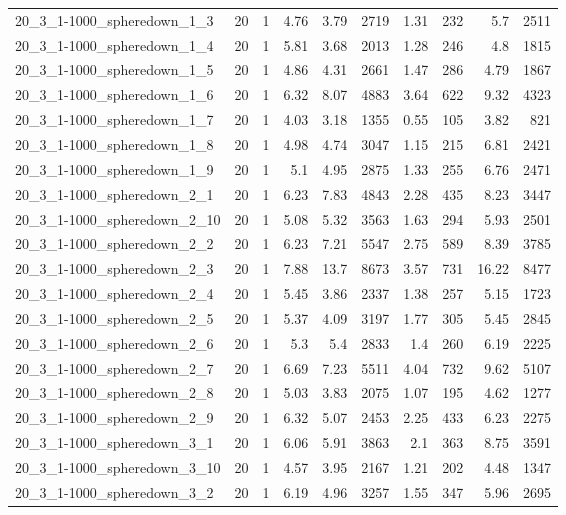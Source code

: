 \begin{center}
\begin{scriptsize}
\begin{longtable}{lrrrrrrrrr}
20\_3\_1-1000\_spheredown\_1\_3 & 20 & 1 & 4.76 & 3.79 & 2719 & 1.31 & 232 & 5.7 & 2511\\
20\_3\_1-1000\_spheredown\_1\_4 & 20 & 1 & 5.81 & 3.68 & 2013 & 1.28 & 246 & 4.8 & 1815\\
20\_3\_1-1000\_spheredown\_1\_5 & 20 & 1 & 4.86 & 4.31 & 2661 & 1.47 & 286 & 4.79 & 1867\\
20\_3\_1-1000\_spheredown\_1\_6 & 20 & 1 & 6.32 & 8.07 & 4883 & 3.64 & 622 & 9.32 & 4323\\
20\_3\_1-1000\_spheredown\_1\_7 & 20 & 1 & 4.03 & 3.18 & 1355 & 0.55 & 105 & 3.82 & 821\\
20\_3\_1-1000\_spheredown\_1\_8 & 20 & 1 & 4.98 & 4.74 & 3047 & 1.15 & 215 & 6.81 & 2421\\
20\_3\_1-1000\_spheredown\_1\_9 & 20 & 1 & 5.1 & 4.95 & 2875 & 1.33 & 255 & 6.76 & 2471\\
20\_3\_1-1000\_spheredown\_2\_1 & 20 & 1 & 6.23 & 7.83 & 4843 & 2.28 & 435 & 8.23 & 3447\\
20\_3\_1-1000\_spheredown\_2\_10 & 20 & 1 & 5.08 & 5.32 & 3563 & 1.63 & 294 & 5.93 & 2501\\
20\_3\_1-1000\_spheredown\_2\_2 & 20 & 1 & 6.23 & 7.21 & 5547 & 2.75 & 589 & 8.39 & 3785\\
20\_3\_1-1000\_spheredown\_2\_3 & 20 & 1 & 7.88 & 13.7 & 8673 & 3.57 & 731 & 16.22 & 8477\\
20\_3\_1-1000\_spheredown\_2\_4 & 20 & 1 & 5.45 & 3.86 & 2337 & 1.38 & 257 & 5.15 & 1723\\
20\_3\_1-1000\_spheredown\_2\_5 & 20 & 1 & 5.37 & 4.09 & 3197 & 1.77 & 305 & 5.45 & 2845\\
20\_3\_1-1000\_spheredown\_2\_6 & 20 & 1 & 5.3 & 5.4 & 2833 & 1.4 & 260 & 6.19 & 2225\\
20\_3\_1-1000\_spheredown\_2\_7 & 20 & 1 & 6.69 & 7.23 & 5511 & 4.04 & 732 & 9.62 & 5107\\
20\_3\_1-1000\_spheredown\_2\_8 & 20 & 1 & 5.03 & 3.83 & 2075 & 1.07 & 195 & 4.62 & 1277\\
20\_3\_1-1000\_spheredown\_2\_9 & 20 & 1 & 6.32 & 5.07 & 2453 & 2.25 & 433 & 6.23 & 2275\\
20\_3\_1-1000\_spheredown\_3\_1 & 20 & 1 & 6.06 & 5.91 & 3863 & 2.1 & 363 & 8.75 & 3591\\
20\_3\_1-1000\_spheredown\_3\_10 & 20 & 1 & 4.57 & 3.95 & 2167 & 1.21 & 202 & 4.48 & 1347\\
20\_3\_1-1000\_spheredown\_3\_2 & 20 & 1 & 6.19 & 4.96 & 3257 & 1.55 & 347 & 5.96 & 2695\\

\end{longtable}
\end{scriptsize}
\end{center}
